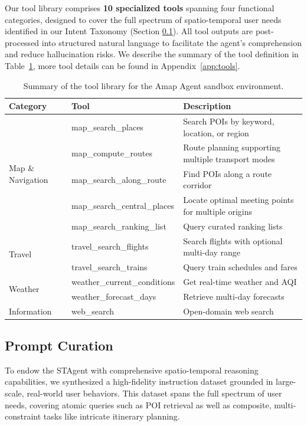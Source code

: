 \documentclass{article} %
\newcommand{\amapagent}{Amap Agent }
\newcommand{\model}{STAgent\xspace}
\begin{document}
Our tool library comprises \textbf{10 specialized tools} spanning four functional categories, designed to cover the full spectrum of spatio-temporal user needs identified in our Intent Taxonomy (Section \ref{sec:prompt}). All tool outputs are post-processed into structured natural language to facilitate the agent's comprehension and reduce hallucination risks. We describe the summary of the tool definition in Table~\ref{tab:tool_library}, more tool details can be found in Appendix~\ref{app:tools}.
\begin{table}[htbp]
\centering
\caption{Summary of the tool library for the \amapagent sandbox environment.}
\label{tab:tool_library}
\begin{tabular}{@{}lll@{}}
\toprule
\textbf{Category} & \textbf{Tool} & \textbf{Description} \\
\midrule
\multirow{5}{*}{Map \& Navigation}
& map\_search\_places & Search POIs by keyword, location, or region \\
& map\_compute\_routes & Route planning supporting multiple transport modes \\
& map\_search\_along\_route & Find POIs along a route corridor \\
& map\_search\_central\_places & Locate optimal meeting points for multiple origins \\
& map\_search\_ranking\_list & Query curated ranking lists \\
\midrule
\multirow{2}{*}{Travel}
& travel\_search\_flights & Search flights with optional multi-day range \\
& travel\_search\_trains & Query train schedules and fares \\
\midrule
\multirow{2}{*}{Weather}
& weather\_current\_conditions & Get real-time weather and AQI \\
& weather\_forecast\_days & Retrieve multi-day forecasts \\
\midrule
Information & web\_search & Open-domain web search \\
\bottomrule
\end{tabular}
\end{table}



\subsection{Prompt Curation} \label{sec:prompt} 

To endow the \model with comprehensive spatio-temporal reasoning capabilities, we synthesized a high-fidelity instruction dataset grounded in large-scale, real-world user behaviors. This dataset spans the full spectrum of user needs, covering atomic queries such as POI retrieval as well as composite, multi-constraint tasks like intricate itinerary planning.
\end{document}
